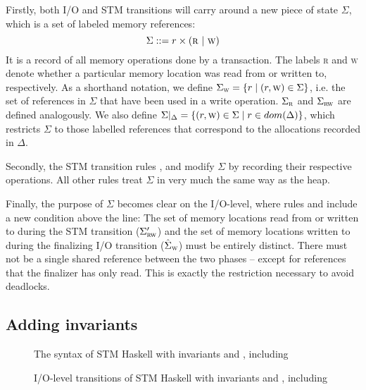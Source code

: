 Firstly, both I/O and STM transitions will carry around a new piece of state $\Sigma$, which is a set of labeled memory references:
$$
\Sigma ::= r \times (\textsc{r}\ \vert\ \textsc{w})
$$
It is a record of all memory operations done by a transaction.
The labels \textsc{r} and \textsc{w} denote whether a particular memory location was read from or written to, respectively.
As a shorthand notation, we define $\Sigma_\textsc{w}=\{r \mid (r,\textsc{w}) \in \Sigma\}$, i.e. the set of references in $\Sigma$ that have been used in a write operation.
$\Sigma_\textsc{r}$ and $\Sigma_\textsc{rw}$ are defined analogously.
We also define $\Sigma\vert_\Delta=\{ (r,\textsc{w}) \in \Sigma \mid r \in dom(\Delta)\}$, which restricts $\Sigma$ to those labelled references that correspond to the allocations recorded in $\Delta$.

Secondly, the STM transition rules ,  and  modify $\Sigma$ by recording their respective operations.
All other rules treat $\Sigma$ in very much the same way as the heap.

Finally, the purpose of $\Sigma$ becomes clear on the I/O-level, where rules  and  include a new condition above the line:
The set of memory locations read from or written to during the STM transition ($\Sigma'_\textsc{rw}$) and the set of memory locations written to during the finalizing I/O transition ($\hat{\Sigma}_\textsc{w}$) must be entirely distinct.
There must not be a single shared reference between the two phases -- except for references that the finalizer has only read.
This is exactly the restriction necessary to avoid deadlocks.


\subsection{Adding invariants}

\begin{figure}

\caption{The syntax of STM Haskell with invariants and , including }
\label{fig:final-syntax}
\end{figure}

\begin{figure}

\caption{I/O-level transitions of STM Haskell with invariants and , including }
\label{fig:final-io}
\end{figure}


